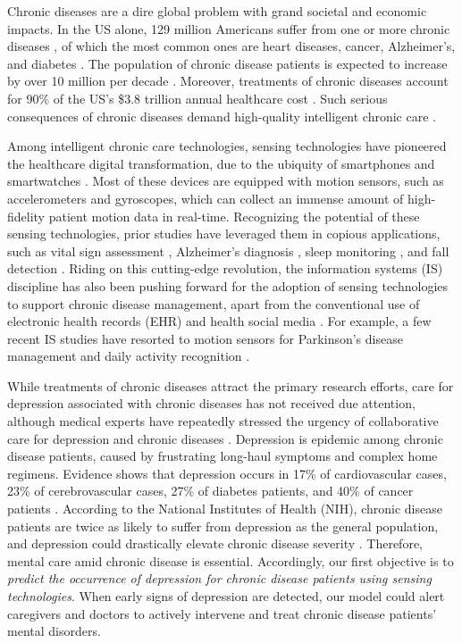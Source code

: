 \documentclass[mnsc]{informs3b} %
\begin{document}
Chronic diseases are a dire global problem with grand societal and economic impacts. In the US alone, 129 million Americans suffer from one or more chronic diseases \citep{anderson_chronic_2010}, of which the most common ones are heart diseases, cancer, Alzheimer’s, and diabetes \citep{cdc_chronic_2022}. The population of chronic disease patients is expected to increase by over 10 million per decade \citep{anderson_chronic_2010}. Moreover, treatments of chronic diseases account for 90\% of the US's \$3.8 trillion annual healthcare cost \citep{cdc_us_2021}. Such serious consequences of chronic diseases demand high-quality intelligent chronic care \citep{dixon-woods_improving_2013}.

Among intelligent chronic care technologies, sensing technologies have pioneered the healthcare digital transformation, due to the ubiquity of smartphones and smartwatches \citep{dadkhah_use_2021}. Most of these devices are equipped with motion sensors, such as accelerometers and gyroscopes, which can collect an immense amount of high-fidelity patient motion data in real-time. Recognizing the potential of these sensing technologies, prior studies have leveraged them in copious applications, such as vital sign assessment \citep{dias_wearable_2018}, Alzheimer’s diagnosis \citep{laplante_structured_2015}, sleep monitoring \citep{lee_sleep_2015}, and fall detection \citep{mozaffari_practical_2019}. Riding on this cutting-edge revolution, the information systems (IS) discipline has also been pushing forward for the adoption of sensing technologies to support chronic disease management, apart from the conventional use of electronic health records (EHR) and health social media \citep{bardhan_role_2017,karahanna_connecting_2020}. For example, a few recent IS studies have resorted to motion sensors for Parkinson’s disease management \citep{yu_wearable_2022} and daily activity recognition \citep{zhu_deep_2021}.

While treatments of chronic diseases attract the primary research efforts, care for depression associated with chronic diseases has not received due attention, although medical experts have repeatedly stressed the urgency of collaborative care for depression and chronic diseases \citep{katon_collaborative_2010}. Depression is epidemic among chronic disease patients, caused by frustrating long-haul symptoms and complex home regimens. Evidence shows that depression occurs in 17\% of cardiovascular cases, 23\% of cerebrovascular cases, 27\% of diabetes patients, and 40\% of cancer patients \citep{cdc_mental_2012}. According to the National Institutes of Health (NIH), chronic disease patients are twice as likely to suffer from depression as the general population, and depression could drastically elevate chronic disease severity \citep{nih_chronic_2022}. Therefore, mental care amid chronic disease is essential. Accordingly, our first objective is to \textit{predict the occurrence of depression for chronic disease patients using sensing technologies}. When early signs of depression are detected, our model could alert caregivers and doctors to actively intervene and treat chronic disease patients’ mental disorders.
\end{document}
